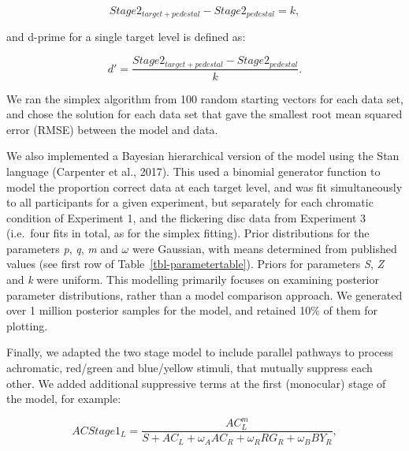 \documentclass[
  letterpaper,
  DIV=11,
  numbers=noendperiod]{scrartcl}
\begin{document}
\begin{equation}
Stage2_{target+pedestal} - Stage2_{pedestal} = k,
\end{equation}

and d-prime for a single target level is defined as:

\begin{equation}
d' = \frac{Stage2_{target+pedestal} - Stage2_{pedestal}}{k}.
\end{equation}

We ran the simplex algorithm from 100 random starting vectors for each
data set, and chose the solution for each data set that gave the
smallest root mean squared error (RMSE) between the model and data.

We also implemented a Bayesian hierarchical version of the model using
the Stan language (Carpenter et al., 2017). This used a binomial
generator function to model the proportion correct data at each target
level, and was fit simultaneously to all participants for a given
experiment, but separately for each chromatic condition of Experiment 1,
and the flickering disc data from Experiment 3 (i.e.~four fits in total,
as for the simplex fitting). Prior distributions for the parameters
\emph{p}, \emph{q}, \emph{m} and \(\omega\) were Gaussian, with means
determined from published values (see first row of
Table~\ref{tbl-parametertable}). Priors for parameters \emph{S},
\emph{Z} and \emph{k} were uniform. This modelling primarily focuses on
examining posterior parameter distributions, rather than a model
comparison approach. We generated over 1 million posterior samples for
the model, and retained 10\% of them for plotting.

Finally, we adapted the two stage model to include parallel pathways to
process achromatic, red/green and blue/yellow stimuli, that mutually
suppress each other. We added additional suppressive terms at the first
(monocular) stage of the model, for example:

\begin{equation}
ACStage1_L = \frac{AC_L^m}{S + AC_L + \omega_A AC_R + \omega_R RG_R + \omega_B BY_R},
\end{equation}
\end{document}
